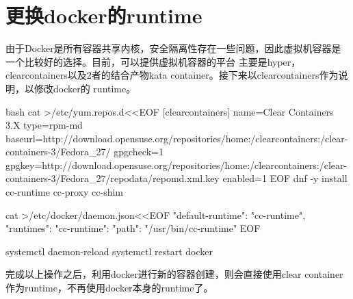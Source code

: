 \section{更换docker的runtime}
由于Docker是所有容器共享内核，安全隔离性存在一些问题，因此虚拟机容器是一个比较好的选择。目前，可以提供虚拟机容器的平台
主要是hyper，clearcontainers以及2者的结合产物kata container。接下来以clearcontainers作为说明，以修改docker的
runtime。
\begin{code-block}{bash}
cat >/etc/yum.repos.d<<EOF
[clearcontainers]
name=Clear Containers 3.X
type=rpm-md
baseurl=http://download.opensuse.org/repositories/home:/clearcontainers:/clear-containers-3/Fedora_27/
gpgcheck=1
gpgkey=http://download.opensuse.org/repositories/home:/clearcontainers:/clear-containers-3/Fedora_27/repodata/repomd.xml.key
enabled=1
EOF
dnf -y install cc-runtime cc-proxy cc-shim

cat >/etc/docker/daemon.json<<EOF
{
    "default-runtime": "cc-runtime",
    "runtimes": {
        "cc-runtime": {
            "path": "/usr/bin/cc-runtime"
        }
    }
}
EOF

systemctl daemon-reload
systemctl restart docker
\end{code-block}
完成以上操作之后，利用docker进行新的容器创建，则会直接使用clear container作为runtime，不再使用docker本身的runtime了。